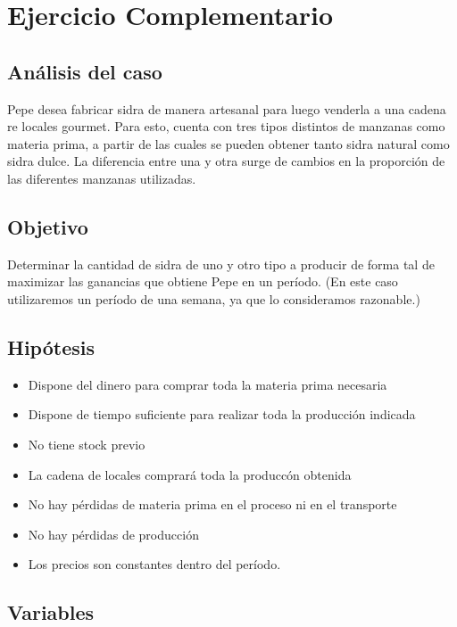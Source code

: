 \documentclass[a4paper,10pt]{article}
\begin{document}
\newpage

\section{Ejercicio Complementario}

\subsection{An\'alisis del caso}

Pepe desea fabricar sidra de manera artesanal para luego venderla a una cadena re locales gourmet. Para esto, cuenta con tres tipos distintos de manzanas como materia prima, a partir de las cuales se pueden obtener tanto sidra natural como sidra dulce. La diferencia entre una y otra surge de cambios en la proporci\'on de las diferentes manzanas utilizadas. 

\subsection{Objetivo}

Determinar la cantidad de sidra de uno y otro tipo a producir de forma tal de maximizar las ganancias que obtiene Pepe en un per\'iodo. (En este caso utilizaremos un per\'iodo de una semana, ya que lo consideramos razonable.)

\subsection{Hip\'otesis}
\begin{itemize}
  \item{Dispone del dinero para comprar toda la materia prima necesaria}
 \item{Dispone de tiempo suficiente para realizar toda la producci\'on indicada}
 \item{No tiene stock previo}
 \item{La cadena de locales comprar\'a toda la producc\'on obtenida}
 \item{No hay p\'erdidas de materia prima en el proceso ni en el transporte}
 \item{No hay p\'erdidas de producci\'on}
 \item{Los precios son constantes dentro del per\'iodo.}
\end{itemize}
 
\subsection{Variables}
\end{document}

